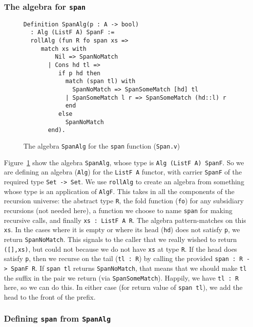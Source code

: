 \documentclass[a4paper,USenglish]{lipics-v2021}
\begin{document}
\subsubsection{The algebra for \texttt{span}}


\begin{figure}
\begin{verbatim}
Definition SpanAlg(p : A -> bool)
  : Alg (ListF A) SpanF :=
  rollAlg (fun R fo span xs => 
     match xs with
         Nil => SpanNoMatch 
       | Cons hd tl =>
          if p hd then
            match (span tl) with
              SpanNoMatch => SpanSomeMatch [hd] tl
            | SpanSomeMatch l r => SpanSomeMatch (hd::l) r
            end
          else
            SpanNoMatch 
       end).
\end{verbatim}
\caption{The algebra \texttt{SpanAlg} for the \texttt{span} function (\texttt{Span.v})}
\label{fig:spanalg}
\end{figure}

Figure~\ref{fig:spanalg} show the algebra
\verb|SpanAlg|, whose type is \verb|Alg (ListF A) SpanF|.  So we are defining
an algebra (\verb|Alg|) for the \verb|ListF A| functor, with carrier
\verb|SpanF| of the required type \verb|Set -> Set|.  We use
\verb|rollAlg| to create an algebra from something whose type is an
application of \verb|AlgF|.  This takes in all the components of the
recursion universe: the abstract type \verb|R|, the fold function
(\verb|fo|) for any subsidiary recursions (not needed here), a
function we choose to name \verb|span| for making recursive calls, and
finally \verb|xs : ListF A R|.  The algebra pattern-matches on this
\verb|xs|.  In the cases where it is empty or where its head
(\verb|hd|) does not satisfy \verb|p|, we return \verb|SpanNoMatch|.
This signals to the caller that we really wished to return
\verb|([],xs)|, but could not because we do not have \verb|xs| at type
\verb|R|.  If the head does satisfy \verb|p|, then we recurse on the
tail (\verb|tl : R|) by calling the provided
\verb|span : R -> SpanF R|.  If \verb|span tl| returns
\verb|SpanNoMatch|, that means that we should make \verb|tl| the
suffix in the pair we return (via \verb|SpanSomeMatch|).  Happily, we
have \verb|tl : R| here, so we can do this.  In either case (for
return value of \verb|span tl|), we add the head to the front of the
prefix.

\subsubsection{Defining \texttt{span} from \texttt{SpanAlg}}
\end{document}
